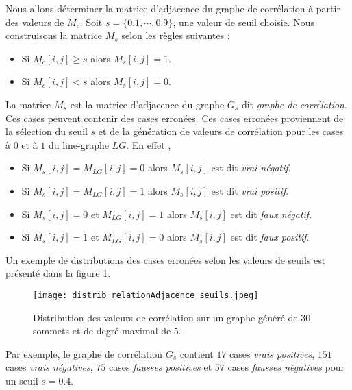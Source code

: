 Nous allons d\'eterminer la matrice d'adjacence du graphe de corr\'elation \`a partir des valeurs de $M_c$.
\newline 
Soit $s = \{ 0.1, \cdots, 0.9\}$, une valeur de seuil choisie.
Nous construisons la matrice $M_s$  selon les r\`egles suivantes : 
\begin{itemize}
\item Si $M_c[i,j] \ge s$ alors $M_s[i,j] = 1$.
\item Si $M_c[i,j] < s$ alors $M_s[i,j] = 0$.
\end{itemize}
La matrice $M_s$ est la matrice d'adjacence du graphe $G_s$  dit {\em graphe de corr\'elation}. Ces cases peuvent contenir des cases erron\'ees. Ces cases erron\'ees proviennent de la s\'election du seuil $s$ et de la g\'en\'eration de valeurs de corr\'elation pour les cases \`a $0$ et \`a $1$ du line-graphe $LG$. En effet ,
\begin{itemize}
	\item Si $M_s [i,j] = M_{LG} [i,j] = 0$ alors $M_{s} [i,j]$ est dit {\em vrai n\'egatif}. 
	\item Si $M_s [i,j] = M_{LG} [i,j] = 1$ alors $M_{s} [i,j]$ est dit {\em vrai positif}. 
	\item Si $M_s [i,j] = 0$ et $M_{LG} [i,j] = 1$ alors $M_{s} [i,j]$ est dit {\em faux n\'egatif}.
	\item Si $M_s [i,j] = 1$ et $M_{LG} [i,j] = 0$ alors $M_{s} [i,j]$ est dit {\em faux positif}.
\end{itemize}
Un exemple de distributions des cases erron\'ees selon les valeurs de seuils est pr\'esent\'e dans la figure \ref{distrib_relationAdjacence_seuils}. 
\begin{figure}[htb!] 
\centering
\texttt{[image: distrib\_relationAdjacence\_seuils.jpeg]}
\caption{ Distribution des valeurs de corr\'elation sur un graphe g\'en\'er\'e de $30$ sommets et de degr\'e maximal de $5$.
.}
\label{distrib_relationAdjacence_seuils} 
\end{figure}
Par exemple,  le graphe de corr\'elation $G_s$ contient 
$17$ cases {\em vrais positives}, 
$151$ cases {\em vrais n\'egatives}, 
$75$ cases {\em fausses positives} et 
$57$ cases {\em fausses n\'egatives} pour un seuil $s=0.4$.
